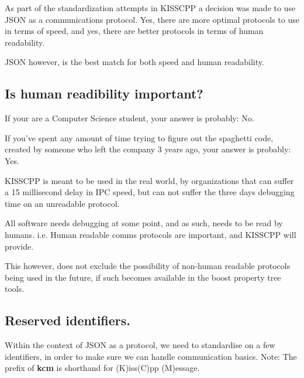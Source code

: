 As part of the standardization attempts in K\-I\-S\-S\-C\-P\-P a decision was made to use J\-S\-O\-N as a communications protocol. Yes, there are more optimal protocols to use in terms of speed, and yes, there are better protocols in terms of human readability.

J\-S\-O\-N however, is the best match for both speed and human readability.

\subsection*{Is human readibility important?}

If your are a Computer Science student, your answer is probably\-: No.

If you've spent any amount of time trying to figure out the spaghetti code, created by someone who left the company 3 years ago, your answer is probably\-: Yes.

K\-I\-S\-S\-C\-P\-P is meant to be used in the real world, by organizations that can suffer a 15 millisecond delay in I\-P\-C speed, but can not suffer the three days debugging time on an unreadable protocol.

All software needs debugging at some point, and as such, needs to be read by humans. i.\-e. Human readable comms protocols are important, and K\-I\-S\-S\-C\-P\-P will provide.

This however, does not exclude the possibility of non-\/human readable protocols being used in the future, if such becomes available in the boost property tree tools.

\subsection*{Reserved identifiers.}

Within the context of J\-S\-O\-N as a protocol, we need to standardise on a few identifiers, in order to make sure we can handle communication basics. Note\-: The prefix of {\bfseries kcm} is shorthand for (K)iss(\-C)pp (M)essage.

